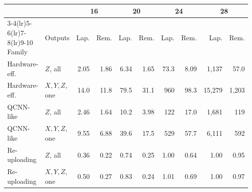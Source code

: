 \begin{tabular}{llrrrrrrrr}
\toprule
 & & \multicolumn{2}{c}{16} & \multicolumn{2}{c}{20} & \multicolumn{2}{c}{24} & \multicolumn{2}{c}{28}\\
\cmidrule(lr){3-4}\cmidrule(lr){5-6}\cmidrule(lr){7-8}\cmidrule(lr){9-10}
Family & Outputs & Lap. & Rem. & Lap. & Rem. & Lap. & Rem. & Lap. & Rem.\\
\midrule
Hardware-eff. & $Z$, all & 2.05 & 1.86 & 6.34 & 1.65 & 73.3 & 8.09 & 1{,}137 & 57.0\\
Hardware-eff. & $X,Y,Z$, one & 14.0 & 11.8 & 79.5 & 31.1 & 960 & 98.3 & 15{,}279 & 1{,}203\\
QCNN-like & $Z$, all & 2.46 & 1.64 & 10.2 & 3.98 & 122 & 17.0 & 1{,}681 & 119\\
QCNN-like & $X,Y,Z$, one & 9.55 & 6.88 & 39.6 & 17.5 & 529 & 57.7 & 6{,}111 & 592\\
Re-uploading & $Z$, all & 0.36 & 0.22 & 0.74 & 0.25 & 1.00 & 0.64 & 1.00 & 0.95\\
Re-uploading & $X,Y,Z$, one & 0.50 & 0.27 & 0.83 & 0.24 & 1.01 & 0.69 & 1.00 & 0.97\\
\bottomrule
\end{tabular}
